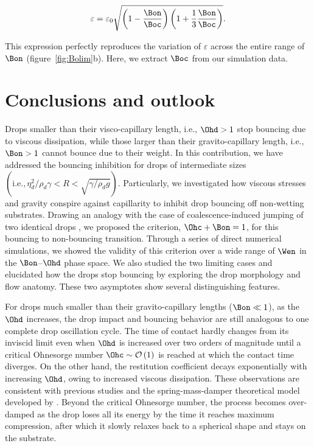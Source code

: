 \begin{align}
	\label{eqn:BianceEtAl_epsilon}
	\varepsilon = \varepsilon_0\sqrt{\left(1-\frac{\Bon}{\Boc}\right)\left(1 + \frac{1}{3}\frac{\Bon}{\Boc}\right)}.
\end{align}

\noindent This expression perfectly reproduces the variation of $\varepsilon$ across the entire range of $\Bon$ (figure~\ref{fig:Bolim}b). Here, we extract $\Boc$ from our simulation data. 

\section{Conclusions and outlook}\label{sec:Conclusion}

Drops smaller than their visco-capillary length, i.e., $\Ohd > 1$ stop bouncing due to viscous dissipation, while those larger than their gravito-capillary length, i.e., $\Bon > 1$ cannot bounce due to their weight. In this contribution, we have addressed the bouncing inhibition for drops of intermediate sizes $\left(\text{i.e.,}\,\eta_d^2/\rho_d\gamma < R < \sqrt{\gamma/\rho_d g}\right)$. Particularly, we investigated how viscous stresses and gravity conspire against capillarity to inhibit drop bouncing off non-wetting substrates. Drawing an analogy with the case of coalescence-induced jumping of two identical drops \citep{boreyko2009, mouterde2017merging, lecointre2019ballistics}, we proposed the criterion, $\Ohc + \Bon = 1$, for this bouncing to non-bouncing transition. Through a series of direct numerical simulations, we showed the validity of this criterion over a wide range of $\Wen$ in the $\Bon$--$\Ohd$ phase space. We also studied the two limiting cases and elucidated how the drops stop bouncing by exploring the drop morphology and flow anatomy. These two asymptotes show several distinguishing features. 

For drops much smaller than their gravito-capillary lengths ($\Bon \ll 1$), as the $\Ohd$ increases, the drop impact and bouncing behavior are still analogous to one complete drop oscillation cycle. The time of contact hardly changes from its inviscid limit even when $\Ohd$ is increased over two orders of magnitude until a critical Ohnesorge number $\Ohc \sim \mathcal{O}\left(1\right)$ is reached at which the contact time diverges. On the other hand, the restitution coefficient decays exponentially with increasing $\Ohd$, owing to increased viscous dissipation. These observations are consistent with previous studies and the spring-mass-damper theoretical model developed by \citet{jha2020viscous}. Beyond the critical Ohnesorge number, the process becomes over-damped as the drop loses all its energy by the time it reaches maximum compression, after which it slowly relaxes back to a spherical shape and stays on the substrate. 

